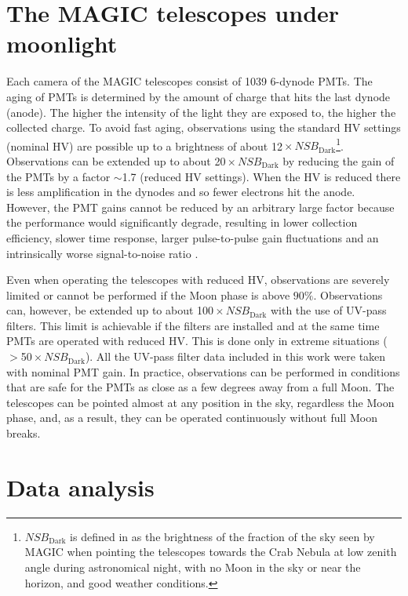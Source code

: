 \documentclass{PoS}
\begin{document}
\section{The MAGIC telescopes under moonlight}\label{sec:MAGIC}

Each camera of the MAGIC telescopes consist of 1039 6-dynode PMTs. The aging of PMTs is determined by the amount of charge that hits the last dynode (anode). The higher the intensity of the light they are exposed to, the higher the collected charge. To avoid fast aging, observations  using the standard HV settings (nominal HV) are possible up to a brightness of about 12\,$\times \,\textit{NSB}_{\text{Dark}}$\footnote{$\textit{NSB}_{\text{Dark}}$ is defined in \cite{MAGIC_moon} as the brightness of the fraction of the sky seen by MAGIC when pointing the telescopes towards the Crab Nebula at low zenith angle during astronomical night, with no Moon in the sky or near the horizon, and good weather conditions.}. Observations can be extended up to about 20\,$\times  \, \textit{NSB}_{\text{Dark}}$ by reducing the gain of the PMTs by a factor $\sim$1.7 (reduced HV settings). When the HV is reduced there is less amplification in the dynodes and so fewer electrons hit the anode. However, the PMT gains cannot be reduced by an arbitrary large factor because the performance would significantly degrade, resulting in lower collection efficiency, slower time response, larger pulse-to-pulse gain fluctuations and an intrinsically worse signal-to-noise ratio \cite{MAGIC_moon, Photonis}.

Even when operating the telescopes with reduced HV, observations are severely limited or cannot be performed if the Moon phase is above $90\%$. Observations can, however, be extended up to about 100\,$\times  \, \textit{NSB}_{\text{Dark}}$ with the use of UV-pass filters. This limit is achievable if the filters are installed and at the same time PMTs are operated with reduced HV. This is done only in extreme situations ($>$50\,$\times  \, \textit{NSB}_{\text{Dark}}$). All the UV-pass filter data included in this work were taken with nominal PMT gain. In practice, observations can be performed in conditions that are safe for the PMTs as close as a few degrees away from a full Moon. The telescopes can be pointed almost at any position in the sky, regardless the Moon phase, and, as a result, they can be operated continuously without full Moon breaks.


\section{Data analysis}
\end{document}
